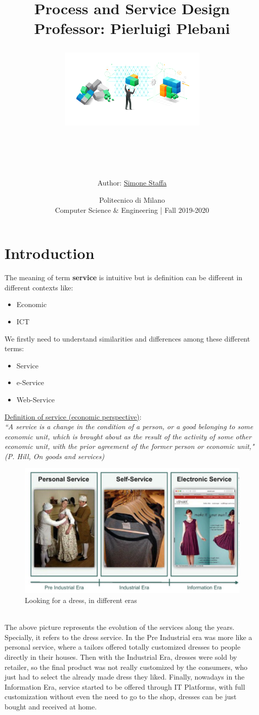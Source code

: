 \documentclass[10pt,a4paper]{article}
\author{Author: \textcolor{MidnightBlue}{\href{https://www.linkedin.com/in/simone-staffa-8b3b79158}{Simone Staffa}}}
\title{{\Huge\textbf{Process and Service Design}
\\ \LARGE Professor: Pierluigi Plebani
\begin{figure}[h!]
 \hfill \includegraphics[width=200pt]{images/cover.png}\hspace*{\fill}
  \label{fig:polimi}
\end{figure} \\
}}
\date{Politecnico di Milano \\ Computer Science $\&$ Engineering | Fall 2019-2020}
\begin{document}
\maketitle
\clearpage
\tableofcontents
\clearpage
\section{\LARGE Introduction}
The meaning of term \textbf{service} is intuitive but is definition can be different in different contexts like:
\begin{itemize}
	\item Economic
	\item ICT
\end{itemize}
We firstly need to understand similarities and differences among these different terms:
\begin{itemize}
	\item Service
	\item e-Service
	\item Web-Service
\end{itemize}
\uline{Definition of service (economic perspective)}: \\
\textit{“A service is a change in the condition of a person, or a good belonging to some economic unit, which is brought about as the result of the activity of some other economic unit, with the prior agreement of the former person or economic unit,"  (P. Hill, On goods and services)} \\
\begin{figure}[h!]
  \includegraphics[width=\linewidth]{images/services-types}
  \caption{Looking for a dress, in different eras}
  \label{fig:service-eras}
\end{figure} \\
The above picture represents the evolution of the services along the years. Specially, it refers to the dress service. In the Pre Industrial era was more like a personal service, where a tailors offered totally customized dresses to people directly in their houses. Then with the Industrial Era, dresses were sold by retailer, so the final product was not really customized by the consumers, who just had to select the already made dress they liked. Finally, nowadays in the Information Era, service started to be offered through IT Platforms, with full customization without even the need to go to the shop, dresses can be just bought and received at home.\\
\end{document}
